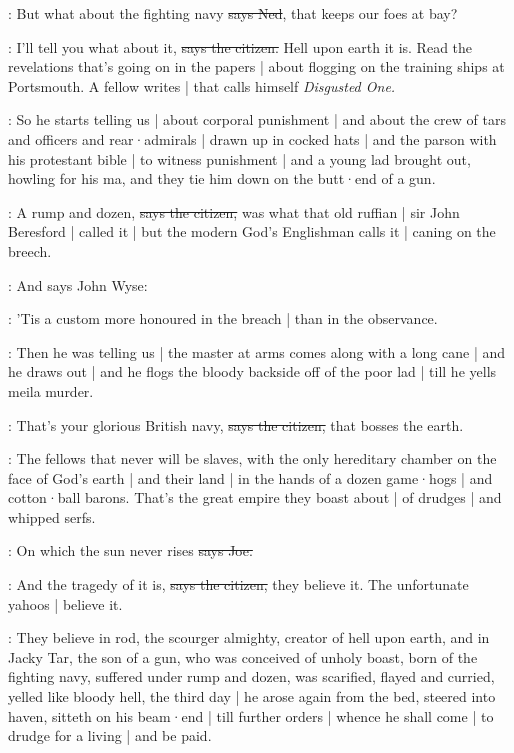 \lambert:
But what about the fighting navy
\sout{says Ned},
that keeps our foes at bay?

\citizen:
I'll tell you what about it,
\sout{says the citizen.}
Hell upon earth it is.
Read the revelations that's going on in the papers |
about flogging on the training ships at Portsmouth.
A fellow writes |
that calls himself \emph{Disgusted One.}

\Nq:
So he starts telling us |
about corporal punishment |
and about the crew of tars and officers and rear·admirals |
drawn up in cocked hats |
and the parson with his protestant bible |
to witness punishment |
and a young lad brought out,
howling for his ma,
and they tie him down on the butt·end of a gun.

\citizen:
A rump and dozen,
\sout{says the citizen,}
was what that old ruffian |
sir John Beresford |
called it |
but the modern God's Englishman calls it |
caning on the breech.%

\Nq:
And says John Wyse:

\johnwyse:
'Tis a custom more honoured in the breach |
than in the observance.

\Nq:
Then he was telling us |
the master at arms
comes along with a long cane |
and he draws out |
and he flogs the bloody backside off of the poor lad |
till he yells meila murder.

\citizen:
That's your glorious British navy,
\sout{says the citizen,}
that bosses the earth.

\citizen:
The fellows that never will be slaves,
with the only hereditary chamber on the face of God's earth |
and their land |
in the hands of a dozen game·hogs |
and cotton·ball barons.
That's the great empire they boast about |
of drudges |
and whipped serfs.%

\joe:
On which the sun never rises
\sout{says Joe.}

\citizen:
And the tragedy of it is,
\sout{says the citizen,}
they believe it.
The unfortunate yahoos |
believe it.

:
They believe in rod,
the scourger almighty,
creator of hell upon earth,
and in Jacky Tar,
the son of a gun,
who was conceived of unholy boast,
born of the fighting navy,
suffered under rump and dozen,
was scarified,
flayed and curried,
yelled like bloody hell,
the third day |
he arose again from the bed,
steered into haven,
sitteth on his beam·end |
till further orders |
whence he shall come |
to drudge for a living |
and be paid.

